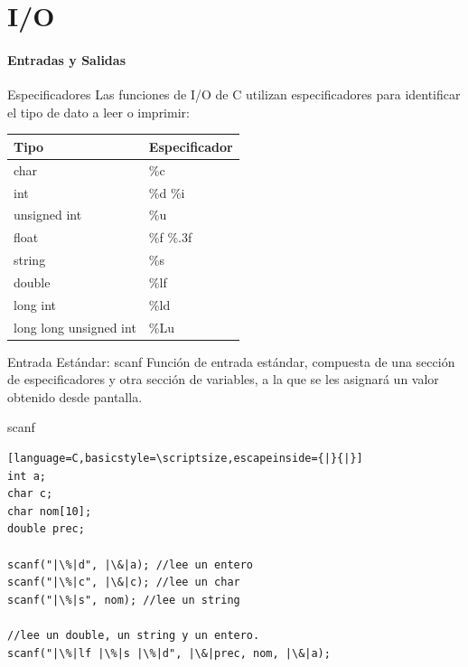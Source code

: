 \documentclass{beamer}
\begin{document}
\part{I/O}
\subsection{Entradas y Salidas}

\begin{frame}{Especificadores}
Las funciones de I/O de C utilizan especificadores para identificar el tipo de dato a leer o imprimir:

\begin{center}
	\small
	\begin{tabular}{|l|l|}\hline \hline
	Tipo & Especificador\\ \hline
	char & \%c \\\hline
	int & \%d \hspace{0.3cm} \%i \\\hline
	unsigned int & \%u \\\hline 
	float & \%f \hspace{0.2cm} \%.3f \\\hline
	string & \%s \\\hline
	double & \%lf \\\hline
	long int & \%ld \\\hline
	long long unsigned int & \%Lu \\\hline
	\end{tabular}
\end{center}
\end{frame}

\begin{frame}[fragile]{Entrada Estándar: scanf}
Función de entrada estándar, compuesta de una sección de especificadores y otra sección de variables, a la que se les asignará un valor obtenido desde pantalla.

\begin{exampleblock}{scanf}
\begin{lstlisting}[language=C,basicstyle=\scriptsize,escapeinside={|}{|}]
int a;
char c;
char nom[10];
double prec;

scanf("|\%|d", |\&|a); //lee un entero
scanf("|\%|c", |\&|c); //lee un char
scanf("|\%|s", nom); //lee un string

//lee un double, un string y un entero.
scanf("|\%|lf |\%|s |\%|d", |\&|prec, nom, |\&|a); 
\end{lstlisting}
\end{exampleblock}
\end{frame}
\end{document}
